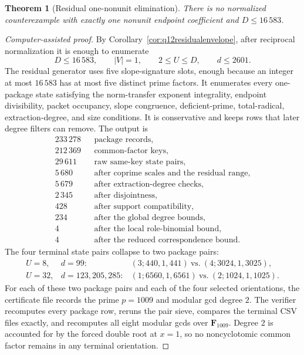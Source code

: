 \documentclass[11pt]{article}
\newtheorem{theorem}{Theorem}[section]
\theoremstyle{definition}
\begin{document}
\begin{theorem}[Residual one-nonunit elimination]
\label{thm:onenonunitresidualelimination}
There is no normalized counterexample with exactly one nonunit endpoint
coefficient and \(D\leq16\,583\).
\end{theorem}

\begin{proof}[Computer-assisted proof]
By Corollary~\ref{cor:q12residualenvelope}, after reciprocal normalization it
is enough to enumerate
\[
 D\leq16\,583,\qquad |V|=1,\qquad 2\leq U\leq D,\qquad d\leq2601.
\]
The residual generator uses five slope-signature slots, enough because an
integer at most \(16\,583\) has at most five distinct prime factors.  It
enumerates every one-package state satisfying the norm-transfer exponent
integrality, endpoint divisibility, packet occupancy, slope congruence,
deficient-prime, total-radical, extraction-degree, and size conditions.  It
is conservative and keeps rows that later degree filters can remove.  The
output is
\[
\begin{array}{rcl}
233\,278 && \text{package records},\\
212\,369 && \text{common-factor keys},\\
 29\,611 && \text{raw same-key state pairs},\\
  5\,680 && \text{after coprime scales and the residual range},\\
  5\,679 && \text{after extraction-degree checks},\\
  2\,345 && \text{after disjointness},\\
    428 && \text{after support compatibility},\\
    234 && \text{after the global degree bounds},\\
      4 && \text{after the local role-binomial bound},\\
      4 && \text{after the reduced correspondence bound}.
\end{array}
\]
The four terminal state pairs collapse to two package pairs:
\[
\begin{array}{ccl}
U=8,  & d=99:  &(3;440,1,441)\ \text{vs.}\ (4;3024,1,3025),\\
U=32, & d=123,205,285: &(1;6560,1,6561)\ \text{vs.}\ (2;1024,1,1025).
\end{array}
\]
For each of these two package pairs and each of the four selected
orientations, the certificate file
 records the
prime \(p=1009\) and modular gcd degree \(2\).  The verifier
 recomputes every package
row, reruns the pair sieve, compares the terminal CSV files exactly, and
recomputes all eight modular gcds over \(\mathbf F_{1009}\).  Degree \(2\) is
accounted for by the forced double root at \(x=1\), so no noncyclotomic
common factor remains in any terminal orientation.
\end{proof}
\end{document}
